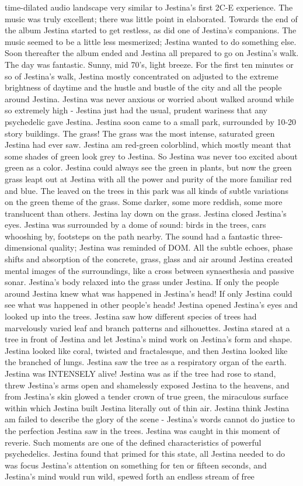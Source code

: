 \documentclass[12pt]{book}
\begin{document}
time-dilated audio landscape very similar to Jestina's first 2C-E experience. The music was truly excellent; there was little point in elaborated. Towards the end of the album Jestina started to get restless, as did one of Jestina's companions. The music seemed to be a little less mesmerized; Jestina wanted to do something else. Soon thereafter the album ended and Jestina all prepared to go on Jestina's walk. The day was fantastic. Sunny, mid 70's, light breeze. For the first ten minutes or so of Jestina's walk, Jestina mostly concentrated on adjusted to the extreme brightness of daytime and the hustle and bustle of the city and all the people around Jestina. Jestina was never anxious or worried about walked around while so extremely high - Jestina just had the usual, prudent wariness that any psychedelic gave Jestina. Jestina soon came to a small park, surrounded by 10-20 story buildings. The grass! The grass was the most intense, saturated green Jestina had ever saw. Jestina am red-green colorblind, which mostly meant that some shades of green look grey to Jestina. So Jestina was never too excited about green as a color. Jestina could always see the green in plants, but now the green grass leapt out at Jestina with all the power and purity of the more familiar red and blue. The leaved on the trees in this park was all kinds of subtle variations on the green theme of the grass. Some darker, some more reddish, some more translucent than others. Jestina lay down on the grass. Jestina closed Jestina's eyes. Jestina was surrounded by a dome of sound: birds in the trees, cars whooshing by, footsteps on the path nearby. The sound had a fantastic three-dimensional quality; Jestina was reminded of DOM. All the subtle echoes, phase shifts and absorption of the concrete, grass, glass and air around Jestina created mental images of the surroundings, like a cross between synaesthesia and passive sonar. Jestina's body relaxed into the grass under Jestina. If only the people around Jestina knew what was happened in Jestina's head! If only Jestina could see what was happened in other people's heads! Jestina opened Jestina's eyes and looked up into the trees. Jestina saw how different species of trees had marvelously varied leaf and branch patterns and silhouettes. Jestina stared at a tree in front of Jestina and let Jestina's mind work on Jestina's form and shape. Jestina looked like coral, twisted and fractalesque, and then Jestina looked like the branched of lungs. Jestina saw the tree as a respiratory organ of the earth. Jestina was INTENSELY alive! Jestina was as if the tree had rose to stand, threw Jestina's arms open and shamelessly exposed Jestina to the heavens, and from Jestina's skin glowed a tender crown of true green, the miraculous surface within which Jestina built Jestina literally out of thin air. Jestina think Jestina am failed to describe the glory of the scene - Jestina's words cannot do justice to the perfection Jestina saw in the trees. Jestina was caught in this moment of reverie. Such moments are one of the defined characteristics of powerful psychedelics. Jestina found that primed for this state, all Jestina needed to do was focus Jestina's attention on something for ten or fifteen seconds, and Jestina's mind would run wild, spewed forth an endless stream of free 
\end{document}
